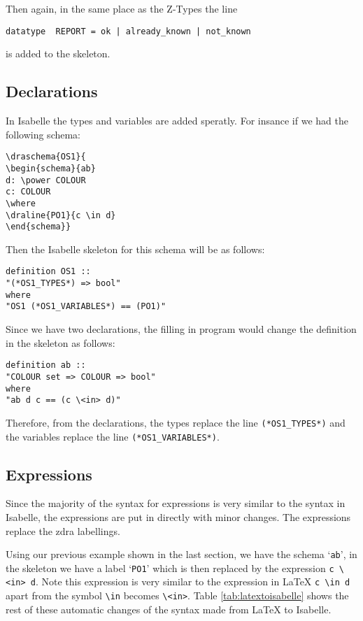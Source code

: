 Then again, in the same place as the Z-Types the line
\begin{verbatim}
datatype  REPORT = ok | already_known | not_known
\end{verbatim}
is added to the skeleton.

\subsection{Declarations}

In Isabelle the types and variables are added speratly. For insance if we had the following schema:

\begin{verbatim}
\draschema{OS1}{
\begin{schema}{ab}
d: \power COLOUR
c: COLOUR
\where
\draline{PO1}{c \in d}
\end{schema}}
\end{verbatim}

Then the Isabelle skeleton for this schema will be as follows:

\begin{verbatim}
definition OS1 ::
"(*OS1_TYPES*) => bool"
where
"OS1 (*OS1_VARIABLES*) == (PO1)"
\end{verbatim}

Since we have two declarations, the filling in program would change the definition in the skeleton as follows:

\begin{verbatim}
definition ab ::
"COLOUR set => COLOUR => bool"
where
"ab d c == (c \<in> d)"
\end{verbatim}

Therefore, from the declarations, the types replace the line \verb|(*OS1_TYPES*)| and the variables replace the line \verb|(*OS1_VARIABLES*)|.

\subsection{Expressions}

Since the majority of the syntax for expressions is very similar to the syntax in Isabelle, the expressions are put in directly with minor changes. The expressions replace the \gls{zdra} labellings.

Using our previous example shown in the last section, we have the schema `\texttt{ab}', in the skeleton we have a label `\texttt{PO1}' which is then replaced by the expression \verb|c \<in> d|. Note this expression is very similar to the expression in \LaTeX{} \verb|c \in d| apart from the symbol \verb|\in| becomes \verb|\<in>|. Table \ref{tab:latextoisabelle} shows the rest of these automatic changes of the syntax made from \LaTeX{} to Isabelle.

